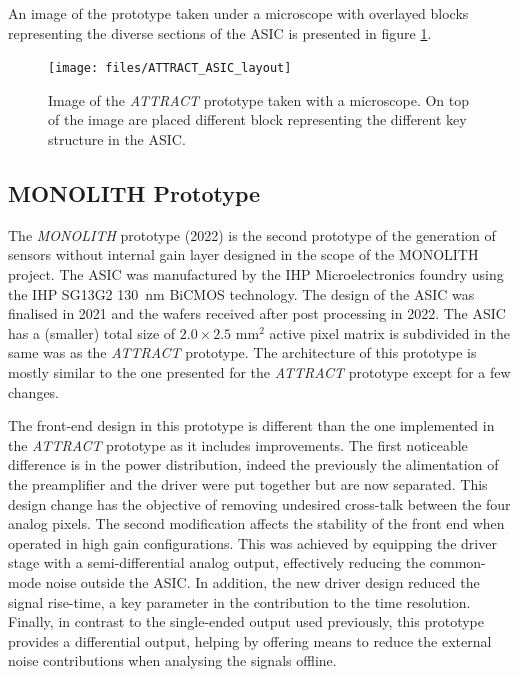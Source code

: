 		An image of the prototype taken under a microscope with overlayed blocks representing the diverse sections of the ASIC is presented in figure \ref{im:ATTRACT_ASIC_layout}.
		\begin{figure}[h]
			\centering
			\texttt{[image: files/ATTRACT\_ASIC\_layout]}
			\caption{Image of the \textit{ATTRACT} prototype taken with a microscope. On top of the image are placed different block representing the different key structure in the ASIC. }
			\label{im:ATTRACT_ASIC_layout}
		\end{figure} 
		
		
		
		
		\subsection{MONOLITH Prototype}
		
		The \textit{MONOLITH} prototype (2022) is the second prototype of the generation of sensors without internal gain layer designed in the scope of the MONOLITH project. The ASIC was manufactured by the IHP Microelectronics foundry using the IHP SG13G2 \SI{130}{\nano\meter} BiCMOS technology. The design of the ASIC was finalised in 2021 and the wafers received after post processing in 2022. The ASIC has a (smaller) total size of $2.0 \times 2.5$ mm$^2$ active pixel matrix is subdivided in the same was as the \textit{ATTRACT} prototype. The architecture of this prototype is mostly similar to the one presented for the \textit{ATTRACT} prototype except for a few changes.  
		
		The front-end design in this prototype is different than the one implemented in the \textit{ATTRACT} prototype as it includes improvements. The first noticeable difference is in the power distribution, indeed the previously the alimentation of the preamplifier and the driver were put together but are now separated. This design change has the objective of removing undesired cross-talk between the four analog pixels. The second modification affects the stability of the front end when operated in high gain configurations. This was achieved by equipping the driver stage with a semi-differential analog output, effectively reducing the common-mode noise outside the ASIC. In addition, the new driver design reduced the signal rise-time, a key parameter in the contribution to the time resolution. Finally, in contrast to the single-ended output used previously, this prototype provides a differential output, helping by offering means to reduce the external noise contributions when analysing the signals offline. 
		
